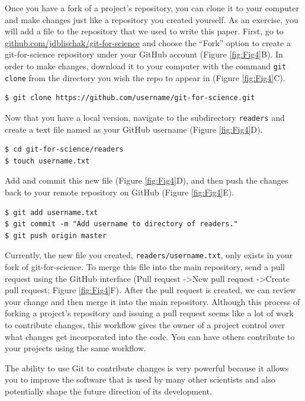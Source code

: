 \documentclass[10pt]{article}
\begin{document}
Once you have a fork of a project's repository, you can clone it to your computer and make changes just like a repository you created yourself.
As an exercise, you will add a file to the repository that we used to write this paper.
First, go to \href{https://github.com/jdblischak/git-for-science}{github.com/jdblischak/git-for-science} and choose the ``Fork'' option to create a git-for-science repository under your GitHub account (Figure \ref{fig:Fig4}B).
In order to make changes, download it to your computer with the command \verb|git clone| from the directory you wish the repo to appear in (Figure \ref{fig:Fig4}C).

\begin{verbatim}
$ git clone https://github.com/username/git-for-science.git
\end{verbatim}

Now that you have a local version, navigate to the subdirectory \verb|readers| and create a text file named as your GitHub username (Figure \ref{fig:Fig4}D).

\begin{verbatim}
$ cd git-for-science/readers
$ touch username.txt
\end{verbatim}

Add and commit this new file (Figure \ref{fig:Fig4}D), and then push the changes back to your remote repository on GitHub (Figure \ref{fig:Fig4}E).

\begin{verbatim}
$ git add username.txt
$ git commit -m "Add username to directory of readers."
$ git push origin master
\end{verbatim}

Currently, the new file you created, \verb|readers/username.txt|, only exists in your fork of git-for-science.
To merge this file into the main repository, send a pull request using the GitHub interface (Pull request -\textgreater New pull request -\textgreater Create pull request; Figure \ref{fig:Fig4}F).
After the pull request is created, we can review your change and then merge it into the main repository.
Although this process of forking a project{'}s repository and issuing a pull request seems like a lot of work to contribute changes, this workflow gives the owner of a project control over what changes get incorporated into the code.
You can have others contribute to your projects using the same workflow.

The ability to use Git to contribute changes is very powerful because it allows you to improve the software that is used by many other scientists and also potentially shape the future direction of its development.
\end{document}
